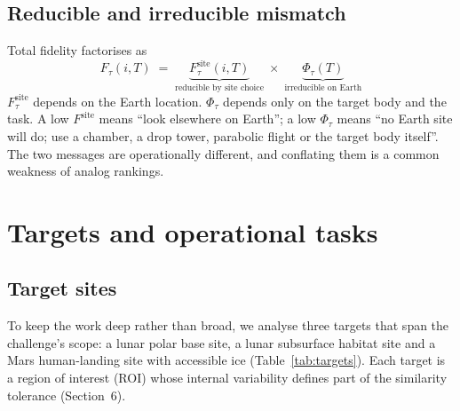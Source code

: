 \documentclass[11pt,a4paper]{article}
\begin{document}
\subsection{Reducible and irreducible mismatch}
Total fidelity factorises as
\begin{equation*}
F_\tau(i,T) \;=\; \underbrace{F^{\mathrm{site}}_\tau(i,T)}_{\text{reducible by site choice}} \;\times\; \underbrace{\Phi_\tau(T)}_{\text{irreducible on Earth}} \tag{1}
\end{equation*}
$F^{\mathrm{site}}_\tau$ depends on the Earth location. $\Phi_\tau$ depends only on the target body and the task. A low $F^{\mathrm{site}}$ means ``look elsewhere on Earth''; a low $\Phi_\tau$ means ``no Earth site will do; use a chamber, a drop tower, parabolic flight or the target body itself''. The two messages are operationally different, and conflating them is a common weakness of analog rankings.

\section{Targets and operational tasks}

\subsection{Target sites}
To keep the work deep rather than broad, we analyse three targets that span the challenge's scope: a lunar polar base site, a lunar subsurface habitat site and a Mars human-landing site with accessible ice (Table~\ref{tab:targets}). Each target is a region of interest (ROI) whose internal variability defines part of the similarity tolerance (Section~6).
\end{document}
